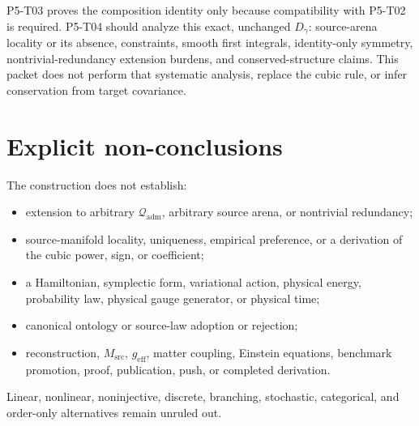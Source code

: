 \documentclass[11pt]{article}
\begin{document}
P5-T03 proves the composition identity only because compatibility with P5-T02
is required.  P5-T04 should analyze this exact, unchanged
\(D_\gamma\): source-arena locality or its absence, constraints, smooth first
integrals, identity-only symmetry, nontrivial-redundancy extension burdens,
and conserved-structure claims.  This packet does not perform that systematic
analysis, replace the cubic rule, or infer conservation from target covariance.

\section{Explicit non-conclusions}

The construction does not establish:
\begin{itemize}
  \item extension to arbitrary \(\mathcal Q_{\mathrm{adm}}\), arbitrary source
  arena, or nontrivial redundancy;
  \item source-manifold locality, uniqueness, empirical preference, or a
  derivation of the cubic power, sign, or coefficient;
  \item a Hamiltonian, symplectic form, variational action, physical energy,
  probability law, physical gauge generator, or physical time;
  \item canonical ontology or source-law adoption or rejection;
  \item reconstruction, \(M_{\mathrm{src}}\), \(g_{\mathrm{eff}}\), matter
  coupling, Einstein equations, benchmark promotion, proof, publication,
  push, or completed derivation.
\end{itemize}
Linear, nonlinear, noninjective, discrete, branching, stochastic,
categorical, and order-only alternatives remain unruled out.
\end{document}
